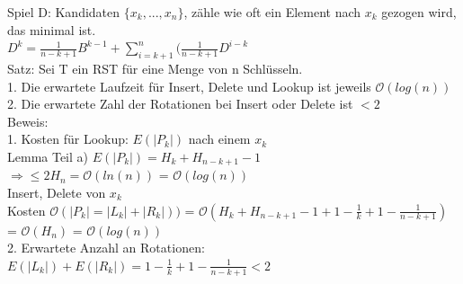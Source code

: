 \documentclass[a4paper]{article}
\newcommand{\oh}[1]{$\mathcal{O}(#1)$}
\begin{document}
Spiel D: Kandidaten $\{x_k,...,x_n\}$, zähle wie oft ein Element nach $x_k$ gezogen wird, das minimal ist.\\
$D^k = \frac{1}{n-k+1}B^{k-1} +\sum_{i=k+1}^n(\frac{1}{n-k+1}D^{i-k}$\\
Satz: Sei T ein RST für eine Menge von n Schlüsseln.\\
1. Die erwartete Laufzeit für Insert, Delete und Lookup ist jeweils \oh{log(n)}\\
2. Die erwartete Zahl der Rotationen bei Insert oder Delete ist $< 2$\\
Beweis:\\
1. Kosten für Lookup: $E(|P_k|)$ nach einem $x_k$\\
Lemma Teil a) $E(|P_k|) = H_k + H_{n-k+1} -1$\\
$\Rightarrow \leq 2H_n = $\oh{ln(n)} = \oh{log(n)}\\
Insert, Delete von $x_k$\\
Kosten \oh{|P_k|=|L_k|+|R_k|)} = \oh{H_k + H_{n-k+1} - 1 +1 - \frac{1}{k}+1 - \frac{1}{n-k+1}} = \oh{H_n} = \oh{log(n)}\\
2. Erwartete Anzahl an Rotationen:\\
$E(|L_k|) + E(|R_k|) = 1-\frac{1}{k} + 1 - \frac{1}{n-k+1} < 2$\\
\end{document}
